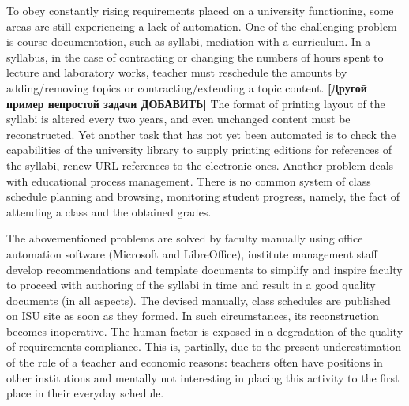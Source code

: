 \documentclass[
]{ceurart}
\begin{document}
To obey constantly rising requirements placed on a university functioning, some areas are still experiencing a lack of automation. One of the challenging problem is course documentation, such as syllabi, mediation with a curriculum. In a syllabus, in the case of contracting or changing the numbers of hours spent to lecture and laboratory works, teacher must reschedule the amounts by adding/removing topics or contracting/extending a topic content.  {\bf[Другой пример непростой задачи ДОБАВИТЬ]} The format of printing layout of the syllabi is altered every two years, and even unchanged content must be reconstructed.  Yet another task that has not yet been automated is to check the capabilities of the university library to supply printing editions for references of the syllabi, renew URL references to the electronic ones.  Another problem deals with educational process management.  There is no common system of class schedule planning and browsing, monitoring student progress, namely, the fact of attending a class and the obtained grades.  %

The abovementioned problems are solved by faculty manually using office automation software (Microsoft and LibreOffice), institute management staff develop recommendations and template documents to simplify and inspire faculty to proceed with authoring of the syllabi in time and result in a good quality documents (in all aspects).  The devised manually, class schedules are published on ISU site as soon as they formed.  In such circumstances, its reconstruction becomes inoperative.   %
The human factor is exposed in a degradation of the quality of requirements compliance.  This is, partially, due to the present underestimation of the role of a teacher and economic reasons: teachers often have positions in other institutions and mentally not interesting in placing this activity to the first place in their everyday schedule.
\end{document}

